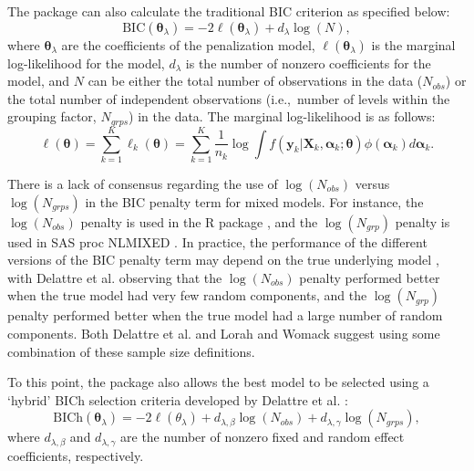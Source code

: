 The package can also calculate the traditional BIC criterion as specified below: \begin{equation*}
  \text{BIC}(\boldsymbol\theta_\lambda) = -2\ell(\boldsymbol\theta_\lambda) + d_\lambda \log(N),
\end{equation*} where \(\boldsymbol \theta_\lambda\) are the
coefficients of the penalization model,
\(\ell(\boldsymbol \theta_\lambda)\) is the marginal log-likelihood for
the model, \(d_\lambda\) is the number of nonzero coefficients for the
model, and \(N\) can be either the total number of observations in the data (\(N_{obs}\)) or the total number of independent observations (i.e.,~number of levels within the grouping factor, \(N_{grps}\)) in the data. The marginal log-likelihood is as
follows: \begin{equation}
  \ell(\boldsymbol \theta) = \sum_{k=1}^K \ell_k(\boldsymbol \theta) = \sum_{k=1}^K \frac{1}{n_k} \log \int f(\boldsymbol y_k | \boldsymbol X_k, \boldsymbol \alpha_k; \boldsymbol \theta) \phi(\boldsymbol \alpha_k) d \boldsymbol \alpha_k.
\end{equation}

There is a lack of consensus regarding the use of $\log(N_{obs})$ versus $\log(N_{grps})$ in the BIC penalty term for mixed models. For instance, the $\log(N_{obs})$ penalty is
used in the R package  \citep{nlmeManual}, and the $\log(N_{grp})$ penalty is used in SAS proc NLMIXED \citep{SAS,BICh2014}. In practice, the performance of the different versions of the BIC penalty term may depend on the true underlying model \citep{lorah2019value,BICh2014}, with Delattre et al. \citeyearpar{BICh2014} observing that the $\log(N_{obs})$ penalty performed better when the true model had very few random components, and the $\log(N_{grp})$ penalty performed better when the true model had a large number of random components. Both Delattre et al. \citeyearpar{BICh2014} and Lorah and Womack \citeyearpar{lorah2019value} suggest using some combination of these sample size definitions.

To this point, the package also allows the best model to be selected using a `hybrid' BICh selection criteria developed by Delattre et al. \citeyearpar{BICh2014}: \begin{equation}
  \text{BICh}(\boldsymbol\theta_\lambda) = -2\ell(\theta_\lambda) + d_{\lambda,\beta} \log(N_{obs}) + d_{\lambda,\gamma} \log(N_{grps}),
\end{equation} where \(d_{\lambda,\beta}\) and \(d_{\lambda,\gamma}\) are the number of nonzero fixed and random effect coefficients, respectively.

